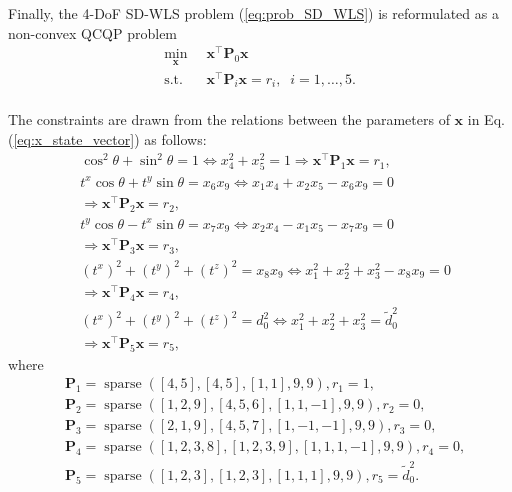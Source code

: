 \documentclass[journal]{IEEEtran}
\begin{document}
Finally, the 4-DoF SD-WLS problem (\ref{eq:prob_SD_WLS}) is reformulated as a non-convex QCQP problem
\begin{equation}\label{eq:prob_QCQP}
\begin{aligned}
    \min\limits_{\mathbf{x}} \;\; & \mathbf{x}^\top \mathbf{P}_0 \mathbf{x}\\
    \textrm{s.t.} \;\; 
    &\mathbf{x}^\top \mathbf{P}_i \mathbf{x} = r_i,\;\;i=1,\dots,5.\\
\end{aligned}
\end{equation}

The constraints are drawn from the relations between the parameters of $\mathbf{x}$ in Eq. (\ref{eq:x_state_vector}) as follows:
\begin{equation}
\begin{aligned}
    &\cos^2\theta + \sin^2\theta = 1 
        \Leftrightarrow
    x_4^2 + x_5^2 = 1
    \Rightarrow \mathbf{x}^\top \mathbf{P}_1 \mathbf{x} = r_1,\\
    &t^x \cos{\theta} + t^y \sin{\theta} = x_6 x_9 
        \Leftrightarrow
    x_1 x_4 {+} x_2 x_5 {-} x_6 x_9 {=} 0 \\
    &\Rightarrow \mathbf{x}^\top \mathbf{P}_2 \mathbf{x} = r_2,\\
    &t^y \cos{\theta} - t^x \sin{\theta} = x_7 x_9 
        \Leftrightarrow
    x_2 x_4 - x_1 x_5 - x_7 x_9 {=} 0 \\
    &\Rightarrow \mathbf{x}^\top \mathbf{P}_3 \mathbf{x} = r_3,\\
    &(t^x)^2 + (t^y)^2 + (t^z)^2 {=} x_8 x_9 
        \Leftrightarrow
    x_1^2 + x_2^2 + x_3^2 - x_8 x_9 {=} 0 \\
    &\Rightarrow \mathbf{x}^\top \mathbf{P}_4 \mathbf{x} = r_4,\\
    &(t^x)^2 + (t^y)^2 + (t^z)^2 = d_0^2 
        \Leftrightarrow
    x_1^2 + x_2^2 + x_3^2 = \tilde{d}_0^2 \\
    & \Rightarrow \mathbf{x}^\top \mathbf{P}_5 \mathbf{x} = r_5,
\end{aligned}
\end{equation}
where
\begin{equation}
\begin{aligned} \label{eq:QCQP_constraints}
    &\mathbf{P}_1 = \operatorname{sparse}([4,5],[4,5],[1,1],9,9),
    r_1 = 1,\\ 
    &\mathbf{P}_2 = \operatorname{sparse}([1,2,9],[4,5,6],[1,1,-1],9,9), 
    r_2 = 0,\\  
    &\mathbf{P}_3 = \operatorname{sparse}([2,1,9],[4,5,7],[1,-1,-1],9,9), 
    r_3 = 0,\\  
    &\mathbf{P}_4 = \operatorname{sparse}([1,2,3,8],[1,2,3,9],[1,1,1,-1],9,9), 
    r_4 = 0,\\  
    &\mathbf{P}_5 = \operatorname{sparse}([1,2,3],[1,2,3],[1,1,1],9,9),
    r_5 = \tilde{d}_0^2. 
\end{aligned}
\end{equation}
\end{document}
